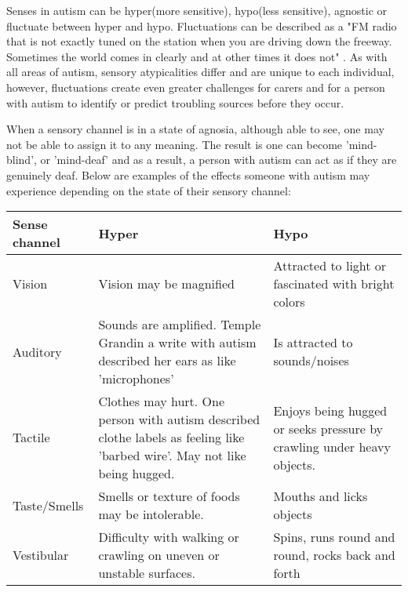 \documentclass[11pt]{report}
\begin{document}
Senses in autism can be hyper(more sensitive), hypo(less sensitive), agnostic or fluctuate between hyper and hypo\cite{bayes}. Fluctuations can be described as a "FM radio that is not exactly tuned on the station when you are driving down the freeway. Sometimes the world comes in clearly and at other times it does not" \cite{olgab}. As with all areas of autism, sensory atypicalities differ and are unique to each individual, however, fluctuations create even greater challenges for carers and for a person with autism to identify or predict troubling sources before they occur. 

When a sensory channel is in a state of agnosia, although able to see, one may not be able to assign it to any meaning. The result is one can become 'mind-blind', or 'mind-deaf' and as a result, a person with autism can act as if they are genuinely deaf. Below are examples of the effects someone with autism may experience depending on the state of their sensory channel:

\begin{table}
    \begin{tabular}{| l | p{5cm} | p{5cm} |}
    \hline
    Sense channel & Hyper                                                                                                                      & Hypo                                                                   \\
    \hline
    \hline
    Vision        & Vision may be magnified                                                                                                    & Attracted to light or fascinated with bright colors                    \\
    \hline
    Auditory      & Sounds are amplified. Temple Grandin a write with autism described her ears as like 'microphones'                          & Is attracted to sounds/noises                                          \\
    \hline
    Tactile       & Clothes may hurt. One person with autism described clothe labels as feeling like 'barbed wire'. May not like being hugged. & Enjoys being hugged or seeks pressure by crawling under heavy objects. \\
    \hline
    Taste/Smells & Smells or texture of foods may be intolerable. & Mouths and licks objects \\
    \hline
    Vestibular & Difficulty with walking or crawling on uneven or unstable surfaces. & Spins, runs round and round, rocks back and forth \\
    \hline
    \end{tabular}
\end{table}
\end{document}
